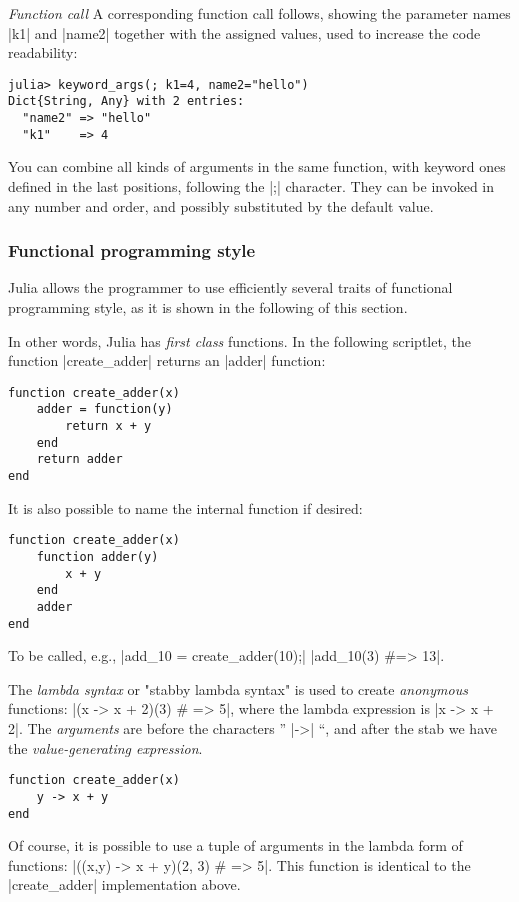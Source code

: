 \begin{coding}\noindent\emph{Function call}
A corresponding {function call} follows, showing the parameter names |k1| and |name2| together with the assigned values, used to increase the code readability:
\begin{lstlisting}[language=JuliaLocal, style=julia, mathescape=false]
julia> keyword_args(; k1=4, name2="hello")
Dict{String, Any} with 2 entries:
  "name2" => "hello"
  "k1"    => 4
\end{lstlisting}
You can combine all kinds of arguments in the same function, with keyword ones defined in the last positions, following the |;| character. They can be invoked in any number and order, and possibly substituted by the default value.
\end{coding} 

\subsubsection*{Functional programming style}

Julia allows the programmer to use efficiently several traits of functional programming style, as it is shown in the following of this section.


\begin{coding} In other words, 
Julia has \emph{first class} functions. In the following scriptlet, the function |create_adder| returns an |adder| function:

\begin{lstlisting}[language=JuliaLocal, style=julia, mathescape=false]
function create_adder(x)
    adder = function(y)
        return x + y
    end
    return adder
end
\end{lstlisting}
It is also possible to name the internal function if desired:

\begin{lstlisting}[language=JuliaLocal, style=julia, mathescape=false]
function create_adder(x)
    function adder(y)
        x + y
    end
    adder
end
\end{lstlisting}
To be called, e.g.,  
|add_10 = create_adder(10);|  |add_10(3) #=> 13|.\\
\end{coding}



\begin{definition}
The \emph{lambda syntax} or "stabby lambda syntax" is used to create \emph{anonymous} functions: |(x -> x + 2)(3) # => 5|,
where the lambda expression is |x -> x + 2|. The \emph{arguments} are before the characters ” |->| “, and after the stab we have the \emph{value-generating expression}.

\begin{lstlisting}[language=JuliaLocal, style=julia, mathescape=false]
function create_adder(x)
    y -> x + y
end
\end{lstlisting}
Of course, it is  possible to use a tuple of arguments in the lambda form of functions: |((x,y) -> x + y)(2, 3) # => 5|. 
This function is identical to the |create_adder| implementation above.
\end{definition}

